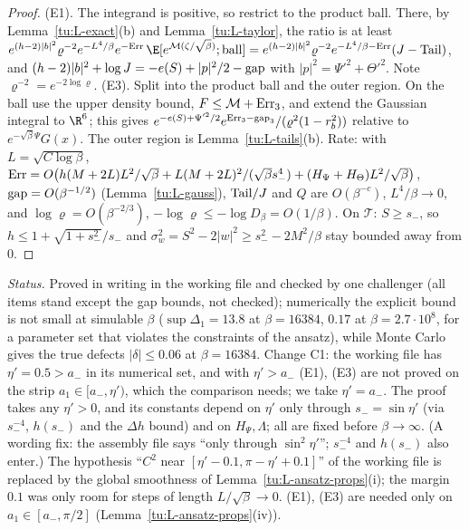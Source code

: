 \begin{proof}
(E1). The integrand is positive, so restrict to the product ball. There, by Lemma~\ref{tu:L-exact}(b) and
Lemma~\ref{tu:L-taylor}, the ratio is at least
$e^{(h-2)|b|^2}\varrho^{-2}e^{-L^4/\beta}e^{-{\rm Err}}\,\E[e^{\mathcal M(\zeta/\sqrt\beta)};\text{ball}]
=e^{(h-2)|b|^2}\varrho^{-2}e^{-L^4/\beta-{\rm Err}}(J-{\rm Tail})$, and
$(h-2)|b|^2+\log J=-e(S)+|p|^2/2-{\rm gap}$ with $|p|^2=\Psi'^2+\Theta'^2$. Note $\varrho^{-2}=e^{-2\log\varrho}$.
(E3). Split into the product ball and the outer region. On the ball use the upper density bound, $F\le\mathcal M+{\rm Err}_3$,
and extend the Gaussian integral to $\R^6$; this gives $e^{-e(S)+\Psi'^2/2}e^{{\rm Err}_3-{\rm gap}_3}/(\varrho^2(1-r_b^2))$
relative to $e^{-\sqrt\beta\Psi}G(x)$. The outer region is Lemma~\ref{tu:L-tails}(b).
Rate: with $L=\sqrt{C\log\beta}$,
${\rm Err}=O\big(h(M+2L)L^2/\sqrt\beta+L(M+2L)^2/(\sqrt\beta s_-^4)+(H_\Psi+H_\Theta)L^2/\sqrt\beta\big)$,
${\rm gap}=O(\beta^{-1/2})$ (Lemma~\ref{tu:L-gauss}), ${\rm Tail}/J$ and $Q$ are $O(\beta^{-c})$, $L^4/\beta\to0$, and
$\log\varrho=O(\beta^{-2/3})$, $-\log\varrho\le-\log D_\beta=O(1/\beta)$. On $\mathcal T$: $S\ge s_-$, so
$h\le1+\sqrt{1+s_-^2}/s_-$ and $\sigma_w^2=S^2-2|w|^2\ge s_-^2-2M^2/\beta$ stay bounded away from $0$.
\end{proof}

\noindent\emph{Status.} Proved in writing in the working file and checked by one challenger (all items
stand except the gap bounds, not checked); numerically the explicit bound is not small at simulable $\beta$
($\sup\Delta_1=13.8$ at $\beta=16384$, $0.17$ at $\beta=2.7\cdot10^8$, for a parameter set that violates the
constraints of the ansatz), while Monte Carlo gives the true defects $|\delta|\le0.06$ at $\beta=16384$.
Change C1: the working file has $\eta'=0.5>a_-$ in its numerical set, and with $\eta'>a_-$ (E1), (E3) are not
proved on the strip $a_1\in[a_-,\eta')$, which the comparison needs; we take $\eta'=a_-$. The proof takes any
$\eta'>0$, and its constants depend on $\eta'$ only through $s_-=\sin\eta'$ (via $s_-^{-4}$, $h(s_-)$ and the
$\Delta h$ bound) and on $H_\Psi,\Lambda$; all are fixed before $\beta\to\infty$. (A wording fix: the assembly
file says ``only through $\sin^2\eta'$''; $s_-^{-4}$ and $h(s_-)$ also enter.) The hypothesis ``$C^2$ near
$[\eta'-0.1,\pi-\eta'+0.1]$'' of the working file is replaced by the global smoothness of
Lemma~\ref{tu:L-ansatz-props}(i); the margin $0.1$ was only room for steps of length $L/\sqrt\beta\to0$.
(E1), (E3) are needed only on $a_1\in[a_-,\pi/2]$ (Lemma~\ref{tu:L-ansatz-props}(iv)).

